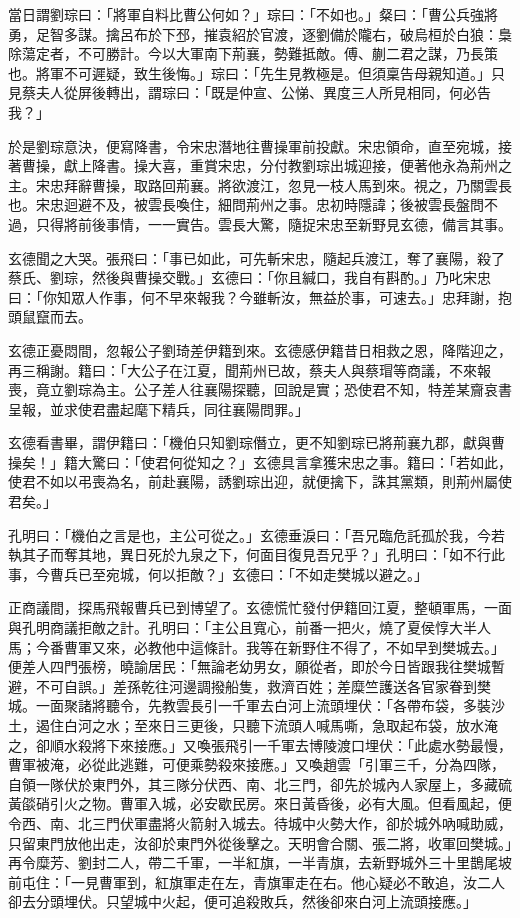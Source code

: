當日謂劉琮曰：「將軍自料比曹公何如？」琮曰：「不如也。」粲曰：「曹公兵強將勇，足智多謀。擒呂布於下邳，摧袁紹於官渡，逐劉備於隴右，破烏桓於白狼：梟除蕩定者，不可勝計。今以大軍南下荊襄，勢難抵敵。傅、蒯二君之謀，乃長策也。將軍不可遲疑，致生後悔。」琮曰：「先生見教極是。但須稟告母親知道。」只見蔡夫人從屏後轉出，謂琮曰：「既是仲宣、公悌、異度三人所見相同，何必告我？」

於是劉琮意決，便寫降書，令宋忠潛地往曹操軍前投獻。宋忠領命，直至宛城，接著曹操，獻上降書。操大喜，重賞宋忠，分付教劉琮出城迎接，便著他永為荊州之主。宋忠拜辭曹操，取路回荊襄。將欲渡江，忽見一枝人馬到來。視之，乃關雲長也。宋忠迴避不及，被雲長喚住，細問荊州之事。忠初時隱諱；後被雲長盤問不過，只得將前後事情，一一實告。雲長大驚，隨捉宋忠至新野見玄德，備言其事。

玄德聞之大哭。張飛曰：「事已如此，可先斬宋忠，隨起兵渡江，奪了襄陽，殺了蔡氏、劉琮，然後與曹操交戰。」玄德曰：「你且緘口，我自有斟酌。」乃叱宋忠曰：「你知眾人作事，何不早來報我？今雖斬汝，無益於事，可速去。」忠拜謝，抱頭鼠竄而去。

玄德正憂悶間，忽報公子劉琦差伊籍到來。玄德感伊籍昔日相救之恩，降階迎之，再三稱謝。籍曰：「大公子在江夏，聞荊州已故，蔡夫人與蔡瑁等商議，不來報喪，竟立劉琮為主。公子差人往襄陽探聽，回說是實；恐使君不知，特差某齎哀書呈報，並求使君盡起麾下精兵，同往襄陽問罪。」

玄德看書畢，謂伊籍曰：「機伯只知劉琮僭立，更不知劉琮已將荊襄九郡，獻與曹操矣！」籍大驚曰：「使君何從知之？」玄德具言拿獲宋忠之事。籍曰：「若如此，使君不如以弔喪為名，前赴襄陽，誘劉琮出迎，就便擒下，誅其黨類，則荊州屬使君矣。」

孔明曰：「機伯之言是也，主公可從之。」玄德垂淚曰：「吾兄臨危託孤於我，今若執其子而奪其地，異日死於九泉之下，何面目復見吾兄乎？」孔明曰：「如不行此事，今曹兵已至宛城，何以拒敵？」玄德曰：「不如走樊城以避之。」

正商議間，探馬飛報曹兵已到博望了。玄德慌忙發付伊籍回江夏，整頓軍馬，一面與孔明商議拒敵之計。孔明曰：「主公且寬心，前番一把火，燒了夏侯惇大半人馬；今番曹軍又來，必教他中這條計。我等在新野住不得了，不如早到樊城去。」便差人四門張榜，曉諭居民：「無論老幼男女，願從者，即於今日皆跟我往樊城暫避，不可自誤。」差孫乾往河邊調撥船隻，救濟百姓；差糜竺護送各官家眷到樊城。一面聚諸將聽令，先教雲長引一千軍去白河上流頭埋伏：「各帶布袋，多裝沙土，遏住白河之水；至來日三更後，只聽下流頭人喊馬嘶，急取起布袋，放水淹之，卻順水殺將下來接應。」又喚張飛引一千軍去博陵渡口埋伏：「此處水勢最慢，曹軍被淹，必從此逃難，可便乘勢殺來接應。」又喚趙雲「引軍三千，分為四隊，自領一隊伏於東門外，其三隊分伏西、南、北三門，卻先於城內人家屋上，多藏硫黃燄硝引火之物。曹軍入城，必安歇民房。來日黃昏後，必有大風。但看風起，便令西、南、北三門伏軍盡將火箭射入城去。待城中火勢大作，卻於城外吶喊助威，只留東門放他出走，汝卻於東門外從後擊之。天明會合關、張二將，收軍回樊城。」再令糜芳、劉封二人，帶二千軍，一半紅旗，一半青旗，去新野城外三十里鵲尾坡前屯住：「一見曹軍到，紅旗軍走在左，青旗軍走在右。他心疑必不敢追，汝二人卻去分頭埋伏。只望城中火起，便可追殺敗兵，然後卻來白河上流頭接應。」

